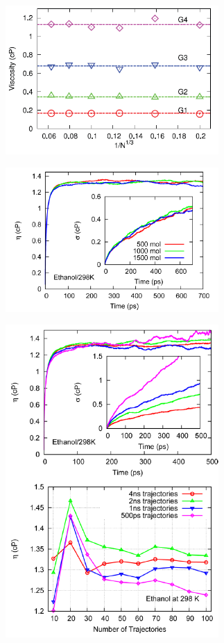 \documentclass[9pt]{livecoms}
\begin{document}
\begin{enumerate}
\end{enumerate}


\begin{figure}[htb!]
	\centering
	\includegraphics[width=3.2in]{figures/MoultosFig3.png}
	\caption{}
	\label{fig:MoultosFig3}
\end{figure}

\begin{figure}[htb!]
	\centering
	\includegraphics[width=3.2in]{figures/ZhangFig9.png}
	\caption{}
	\label{fig:ZhangFig9}
\end{figure}

\begin{figure}[htb!]
	\centering
	\includegraphics[width=3.2in]{figures/ZhangFig8.png}
	\caption{}
	\label{fig:ZhangFig8}
\end{figure}
\end{document}
